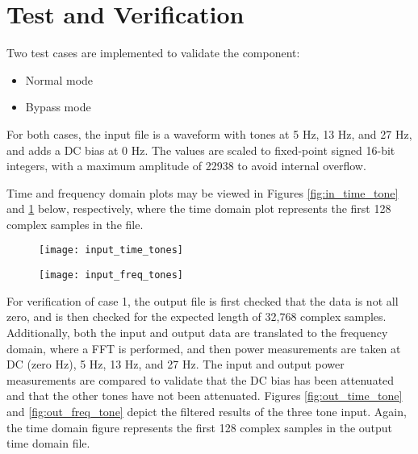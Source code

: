 \section*{Test and Verification}
\normalsize
Two test cases are implemented to validate the \Comp{} component:
\begin{itemize}
	\item[1)] Normal mode
	\item[2)] Bypass mode
\end{itemize}
\noindent For both cases, the input file is a waveform with tones at 5 Hz, 13 Hz, and 27 Hz, and adds a DC bias at 0 Hz. The values are scaled to fixed-point signed 16-bit integers, with a maximum amplitude of 22938 to avoid internal overflow.\par\medskip
\noindent Time and frequency domain plots may be viewed in Figures \ref{fig:in_time_tone} and \ref{fig:in_freq_tone} below, respectively, where the time domain plot represents the first 128 complex samples in the file.

\begin{figure}[ht]
	\centering
	\begin{minipage}{.5\textwidth}
		\centering\texttt{[image: input\_time\_tones]}
		\label{fig:in_time_tone}
	\end{minipage}%
	\begin{minipage}{.5\textwidth}
		\centering\texttt{[image: input\_freq\_tones]}
		\label{fig:in_freq_tone}
	\end{minipage}
\end{figure}

\noindent For verification of case 1, the output file is first checked that the data is not all zero, and is then checked for the expected length of 32,768 complex samples. Additionally, both the input and output data are translated to the frequency domain, where a FFT is performed, and then power measurements are taken at DC (zero Hz), 5 Hz, 13 Hz, and 27 Hz. The input and output power measurements are compared to validate that the DC bias has been attenuated and that the other tones have not been attenuated. Figures \ref{fig:out_time_tone} and \ref{fig:out_freq_tone} depict the filtered results of the three tone input. Again, the time domain figure represents the first 128 complex samples in the output time domain file.

